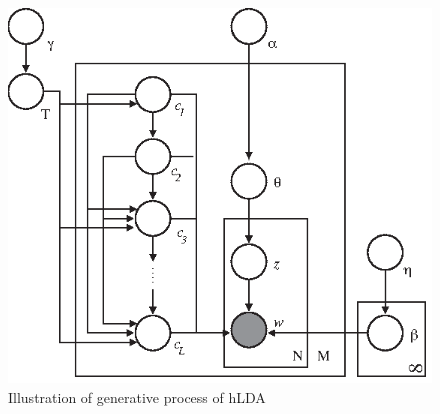 \documentclass[DIV=calc, paper=letter, fontsize=10pt, twocolumn]{scrartcl}	 %
\begin{document}
			\begin{figure}[!ht]
				\centerline{\includegraphics[scale = 0.8]{hLDA_paper.eps}}
				\caption{Illustration of generative process of hLDA \cite{2}}
				\label{fig: hLDA}
			\end{figure}
\end{document}
